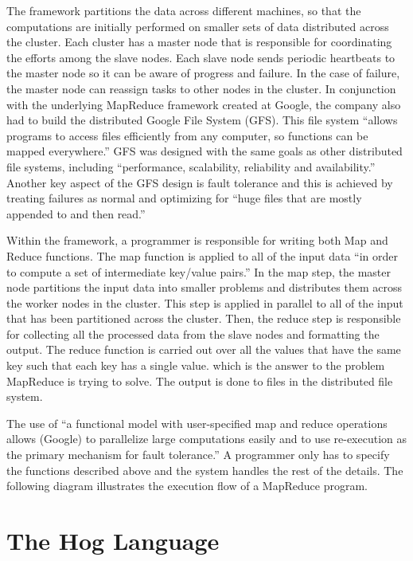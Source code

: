 \documentclass{book}
\begin{document}
The framework partitions the data across different machines, so that the
computations are initially performed on smaller sets of data distributed across the
cluster. Each cluster has a master node that is responsible for coordinating the
efforts among the slave nodes. Each slave node sends periodic heartbeats to the
master node so it can be aware of progress and failure. In the case of failure, the
master node can reassign tasks to other nodes in the cluster. In conjunction with
the underlying MapReduce framework created at Google, the company also had to build
the distributed Google File System (GFS). This file system ``allows programs to
access files efficiently from any computer, so functions can be mapped
everywhere.'' GFS was designed with the same goals as other distributed file
systems, including ``performance, scalability, reliability and availability.''
Another key aspect of the GFS design is fault tolerance and this is achieved by
treating failures as normal and optimizing for ``huge files that are mostly
appended to and then read.''

Within the framework, a programmer is responsible for writing both Map and Reduce
functions. The map function is applied to all of the input data ``in order to
compute a set of intermediate key/value pairs.'' In the map step, the master node
partitions the input data into smaller problems and distributes them across the
worker nodes in the cluster. This step is applied in parallel to all of the input
that has been partitioned across the cluster. Then, the reduce step is responsible
for collecting all the processed data from the slave nodes and formatting the
output. The reduce function is carried out over all the values that have the same
key such that each key has a single value. which is the answer to the problem
MapReduce is trying to solve. The output is done to files in the distributed file
system.

The use of ``a functional model with user-specified map and reduce operations
allows (Google) to parallelize large computations easily and to use re-execution as
the primary mechanism for fault tolerance.'' A programmer only has to specify the
functions described above and the system handles the rest of the details. The
following diagram illustrates the execution flow of a MapReduce program.

\section{The Hog Language}
\label{sec:hog_language}
\end{document}
